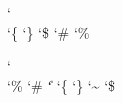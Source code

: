 

\ifdefined\nilcatcodes \else \newcatcodetable \nilcatcodes  \fi
\ifdefined\texcatcodes \else \newcatcodetable \texcatcodes  \fi
\ifdefined\luacatcodes \else \newcatcodetable \luacatcodes  \fi
\ifdefined\notcatcodes \else \newcatcodetable \notcatcodes  \fi
\ifdefined\vrbcatcodes \else \newcatcodetable \vrbcatcodes  \fi
\ifdefined\prtcatcodes \else \newcatcodetable \prtcatcodes  \fi

\startcatcodetable \nilcatcodes
    \catcode\tabasciicode      \spacecatcode
    \catcode\endoflineasciicode\endoflinecatcode
    \catcode\formfeedasciicode \endoflinecatcode
    \catcode\spaceasciicode    \spacecatcode
    \catcode\endoffileasciicode\ignorecatcode
\stopcatcodetable

\startcatcodetable \texcatcodes
    \catcode\tabasciicode       \spacecatcode
    \catcode\endoflineasciicode \endoflinecatcode
    \catcode\formfeedasciicode  \endoflinecatcode
    \catcode\spaceasciicode     \spacecatcode
    \catcode\endoffileasciicode \ignorecatcode
    \catcode\caretasciicode     \superscriptcatcode
    \catcode\underscoreasciicode\subscriptcatcode
    \catcode\ampersandasciicode \alignmentcatcode
    \catcode`\\                 \escapecatcode
    \catcode`\{                 \begingroupcatcode
    \catcode`\}                 \endgroupcatcode
    \catcode`\$                 \mathshiftcatcode
    \catcode`\#                 \parametercatcode
    \catcode`\%                 \commentcatcode
\stopcatcodetable

\startcatcodetable \luacatcodes
    \catcode\tabasciicode       \othercatcode
    \catcode\endoflineasciicode \othercatcode
    \catcode\formfeedasciicode  \othercatcode
    \catcode\spaceasciicode     \othercatcode
    \catcode\endoffileasciicode \ignorecatcode
    \catcode\caretasciicode     \othercatcode
    \catcode\underscoreasciicode\othercatcode
    \catcode\ampersandasciicode \othercatcode
    \catcode`\\                 \escapecatcode
    \catcode`\%                 \othercatcode
    \catcode`\#                 \othercatcode
    \catcode`\|                 \othercatcode
    \catcode`\{                 \othercatcode
    \catcode`\}                 \othercatcode
    \catcode`\~                 \othercatcode
    \catcode`\$                 \othercatcode
\stopcatcodetable

